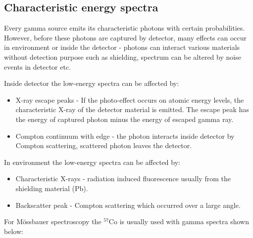 \subsection{Characteristic energy spectra}
Every gamma source emits its characteristic photons with certain probabilities. However, before these photons are captured by detector, many effects can occur in environment or inside the detector - photons can interact various materials without detection purpose such as shielding, spectrum can be altered by 
noise events in detector etc.
\par
Inside detector the low-energy spectra can be affected by:
\begin{itemize}
\item X-ray escape peaks - If the photo-effect occurs on atomic energy levels, the characteristic X-ray of the detector material is emitted. The escape peak has the energy of captured photon minus the energy of escaped gamma ray.
\item Compton continuum with edge - the photon interacts inside detector by Compton scattering, scattered photon leaves the detector.

\end{itemize}

In environment the low-energy spectra can be affected by:
\begin{itemize}
\item Characteristic X-rays - radiation induced fluorescence usually from the shielding material (Pb).
\item Backscatter peak - Compton scattering which occurred over a large angle.
\end{itemize}


For Mössbauer spectroscopy the $^{57}$Co is usually used with gamma spectra shown below:


